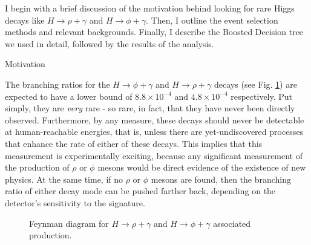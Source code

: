 %
%

I begin with a brief discussion of the motivation behind looking for rare Higgs decays like $H \rightarrow \rho+\gamma$ and $H \rightarrow \phi+\gamma$. Then, I outline the event selection methods and relevant backgrounds. Finally, I describe the Boosted Decision tree we used in detail, followed by the results of the analysis.

\begin{section}{Motivation}

The branching ratios for the $H \rightarrow \phi+\gamma$ and $H \rightarrow \rho+\gamma$ decays (see Fig. \ref{fig:whiggs}) are expected to have a lower bound of $8.8 \times 10^{-4}$ and $4.8 \times 10^{-4}$  respectively\cite{cite-rpg-brs}. Put simply, they are \textit{very} rare - so rare, in fact, that they have never been directly observed. Furthermore, by any measure, these decays should never be detectable at human-reachable energies, that is, unless there are yet-undiscovered processes that enhance the rate of either of these decays. This implies that this measurement is experimentally exciting, because any significant measurement of the production of $\rho$ or $\phi$ mesons would be direct evidence of the existence of new physics. At the same time, if no $\rho$ or $\phi$ mesons are found, then the branching ratio of either decay mode can be pushed farther back, depending on the detector's sensitivity to the signature.

\begin{figure}[htb]
\begin{center}

\end{center}
\caption{Feynman diagram\cite{cite-tikz-feynman} for $H \rightarrow \rho+\gamma$ and $H \rightarrow \phi+\gamma$ associated production.}
\label{fig:whiggs}
\end{figure}
\end{section}


